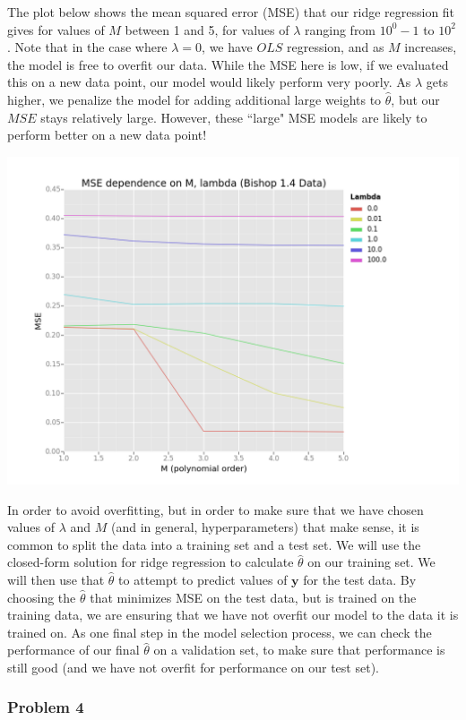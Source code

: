 \documentclass[10pt]{article}
\begin{document}
The plot below shows the mean squared error (MSE) that our ridge regression fit gives for values of $M$ between 1 and 5, for values of $\lambda$ ranging from $10^0 -1$ to $10^2$. Note that in the case where $\lambda = 0$, we have $OLS$ regression, and as $M$ increases, the model is free to overfit our data. While the MSE here is low, if we evaluated this on a new data point, our model would likely perform very poorly. As $\lambda$ gets higher, we penalize the model for adding additional large weights to $\hat{\theta}$, but our $MSE$ stays relatively large. However, these ``large" MSE models are likely to perform better on a new data point!

\begin{center}
\includegraphics[scale=.4]{MSE_Lambda_Bishop.png}
\end{center}

In order to avoid overfitting, but in order to make sure that we have chosen values of $\lambda$ and $M$ (and in general, hyperparameters) that make sense, it is common to split the data into a training set and a test set. We will use the closed-form solution for ridge regression to calculate $\hat{\theta}$ on our training set. We will then use that $\hat{\theta}$ to attempt to predict values of $\mathbf{y}$ for the test data. By choosing the $\hat{\theta}$ that minimizes MSE on the test data, but is trained on the training data, we are ensuring that we have not overfit our model to the data it is trained on. As one final step in the model selection process, we can check the performance of our final $\hat{\theta}$ on a validation set, to make sure that performance is still good (and we have not overfit for performance on our test set).


\subsubsection*{Problem 4}


	
\end{document}
